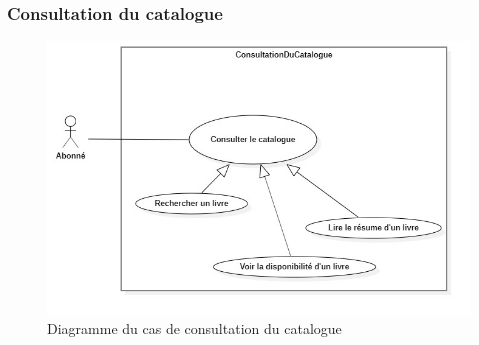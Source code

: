 \subsubsection{Consultation du catalogue} 
\begin{figure}[h]
        \centering
        \includegraphics[width=1\textwidth]{consultationDuCatalogueUseCase}
        \caption{Diagramme du cas de consultation du catalogue}
        \label{image-consultationDuCatalogueUseCase}
        \end{figure}
